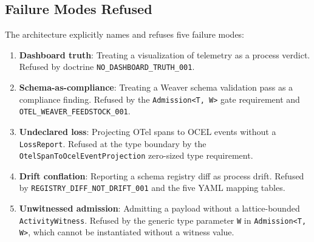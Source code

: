 \subsection{Failure Modes Refused}
\label{sec:otel-weaver-arch-failures}

The architecture explicitly names and refuses five failure modes:

\begin{enumerate}
  \item \textbf{Dashboard truth}: Treating a visualization of telemetry as a process verdict.
    Refused by doctrine \texttt{NO\_DASHBOARD\_TRUTH\_001}.
  \item \textbf{Schema-as-compliance}: Treating a Weaver schema validation pass as a compliance
    finding. Refused by the \texttt{Admission<T,\,W>} gate requirement and
    \texttt{OTEL\_WEAVER\_FEEDSTOCK\_001}.
  \item \textbf{Undeclared loss}: Projecting OTel spans to OCEL events without a
    \texttt{LossReport}. Refused at the type boundary by the
    \texttt{OtelSpanToOcelEventProjection} zero-sized type requirement.
  \item \textbf{Drift conflation}: Reporting a schema registry diff as process drift.
    Refused by \texttt{REGISTRY\_DIFF\_NOT\_DRIFT\_001} and the five YAML mapping tables.
  \item \textbf{Unwitnessed admission}: Admitting a payload without a lattice-bounded
    \texttt{ActivityWitness}. Refused by the generic type parameter \texttt{W} in
    \texttt{Admission<T,\,W>}, which cannot be instantiated without a witness value.
\end{enumerate}
